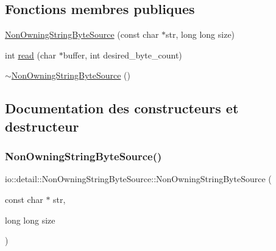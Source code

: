 \subsection*{Fonctions membres publiques}
\begin{DoxyCompactItemize}
\item 
\hyperlink{classio_1_1detail_1_1NonOwningStringByteSource_a8fd604017b38e20f90386b6e10bd95a3}{Non\+Owning\+String\+Byte\+Source} (const char $\ast$str, long long size)
\item 
int \hyperlink{classio_1_1detail_1_1NonOwningStringByteSource_aba194be7e3a141f40d683db483a620bb}{read} (char $\ast$buffer, int desired\+\_\+byte\+\_\+count)
\item 
\hyperlink{classio_1_1detail_1_1NonOwningStringByteSource_aa727fc8845a570b7a7a2367da3fe0adf}{$\sim$\+Non\+Owning\+String\+Byte\+Source} ()
\end{DoxyCompactItemize}


\subsection{Documentation des constructeurs et destructeur}
\mbox{\label{classio_1_1detail_1_1NonOwningStringByteSource_a8fd604017b38e20f90386b6e10bd95a3}} 
\subsubsection{\texorpdfstring{Non\+Owning\+String\+Byte\+Source()}{NonOwningStringByteSource()}}
{\footnotesize\ttfamily io\+::detail\+::\+Non\+Owning\+String\+Byte\+Source\+::\+Non\+Owning\+String\+Byte\+Source (\begin{DoxyParamCaption}\item[{const char $\ast$}]{str,  }\item[{long long}]{size }\end{DoxyParamCaption})\hspace{0.3cm}{\ttfamily [inline]}}

\mbox{\label{classio_1_1detail_1_1NonOwningStringByteSource_aa727fc8845a570b7a7a2367da3fe0adf}} 
